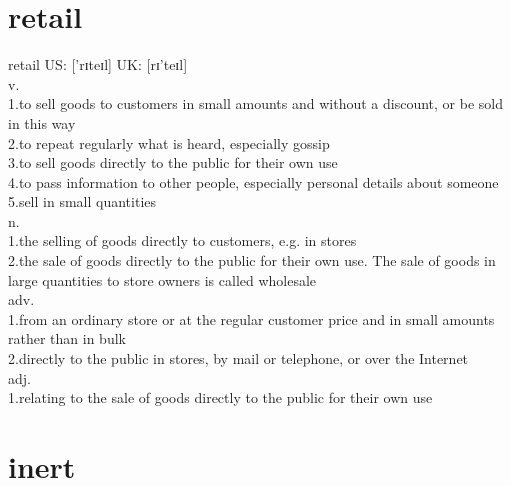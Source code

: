 \documentclass[11pt]{article}
\begin{document}
\section{retail}
\label{sec:org69c64d8}
retail US: ['rɪteɪl] UK: [rɪ'teɪl]\\
v.\\
1.to sell goods to customers in small amounts and without a discount, or be sold in this way\\
2.to repeat regularly what is heard, especially gossip\\
3.to sell goods directly to the public for their own use\\
4.to pass information to other people, especially personal details about someone\\
5.sell in small quantities\\
n.\\
1.the selling of goods directly to customers, e.g. in stores\\
2.the sale of goods directly to the public for their own use. The sale of goods in large quantities to store owners is called wholesale\\
adv.\\
1.from an ordinary store or at the regular customer price and in small amounts rather than in bulk\\
2.directly to the public in stores, by mail or telephone, or over the Internet\\
adj.\\
1.relating to the sale of goods directly to the public for their own use\\
\section{inert}
\label{sec:orgfcfad95}
\end{document}
